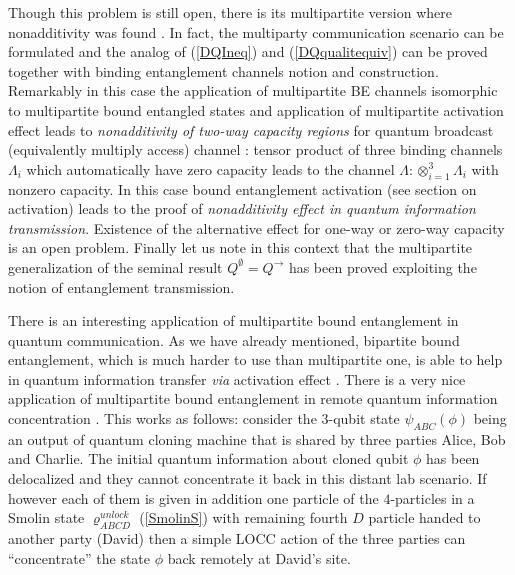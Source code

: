 \documentclass[rmp,12pt,preprint]{revtex4-2}
\begin{document}
Though this problem is still  open, there is its multipartite
version where nonadditivity was found \cite{DuHoCi04}. In fact, the
multiparty communication scenario can be formulated and the analog
of (\ref{DQIneq}) and (\ref{DQqualitequiv}) can be proved
\cite{DuHoCi04} together with binding entanglement channels notion
and construction. Remarkably in this case the application of
multipartite BE channels isomorphic to multipartite bound entangled
states and application of multipartite activation effect leads to
{\it nonadditivity of two-way capacity regions} for quantum
broadcast (equivalently multiply access) channel \cite{DuHoCi04}:
tensor product of three binding channels $\Lambda_{i}$ which
automatically have zero capacity leads to the channel
$\Lambda:\otimes_{i=1}^{3}\Lambda_{i}$ with nonzero capacity. In
this case bound entanglement activation (see section on activation)
leads to the proof of {\it nonadditivity effect in quantum
information transmission}. Existence of the alternative effect for
one-way or zero-way capacity is an open problem.
Finally let us note in this context that the multipartite
generalization of the seminal result $Q^{ \emptyset
}=Q^{\rightarrow}$ has been proved  \cite{DemianowiczZero-Way} exploiting the notion  of entanglement transmission.

There is an interesting application of multipartite bound
entanglement in quantum communication. As we have already mentioned,
bipartite bound entanglement, which is much harder to use than
multipartite one, is able to help in quantum information transfer
{\it via} activation effect \cite{activation}. There is a very nice
application of multipartite bound entanglement in remote quantum
information concentration \cite{MuraoV1999-concentration}. This
works as follows: consider  the 3-qubit state $\psi_{ABC}(\phi)$
being an output of quantum cloning machine
that is shared by three parties Alice, Bob and
Charlie. The initial quantum information about cloned qubit $\phi$
 has been delocalized and they cannot concentrate it back
 in this distant lab scenario. If however each of them is given in addition one
particle of the $4$-particles in a Smolin state
$\varrho^{unlock}_{ABCD}$ (\ref{SmolinS}) with remaining fourth $D$
particle handed to another party (David) then a simple LOCC action of
the three parties can ``concentrate'' the state $\phi$ back remotely
at David's site.
\end{document}
